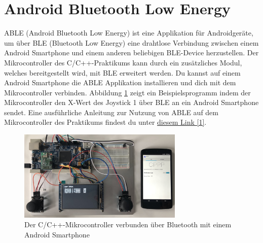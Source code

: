 \section{\ExercisePrefixEmbeddedC Android Bluetooth Low Energy \optional}
ABLE (Android Bluetooth Low Energy) ist eine Applikation für Androidgeräte, um über BLE (Bluetooth Low Energy) eine drahtlose Verbindung zwischen einem Android Smartphone und einem anderen beliebigen BLE-Device herzustellen. Der Mikrocontroller des C/C++-Praktikums kann durch ein zusätzliches Modul, welches bereitgestellt wird, mit BLE erweitert werden. Du kannst auf einem Android Smartphone die ABLE Applikation installieren und dich mit dem Mikrocontroller verbinden. Abbildung \ref{fig:ablePreview} zeigt ein Beispielsprogramm indem der Mikrocontroller den X-Wert des Joystick 1 über BLE an ein Android Smartphone sendet. Eine ausführliche Anleitung zur Nutzung von ABLE auf dem Mikrocontroller des Praktikums findest du unter \href{https://github.com/Echtzeitsysteme/able/wiki/Cpp-Lab-Tutorial}{diesem Link [1]}. 
\begin{figure}[!htb]
	\centering
	\includegraphics[width=0.7\textwidth]{./05_c/figures/ABLE_preview.jpg}
	\caption{Der C/C++-Mikrocontroller verbunden über Bluetooth mit einem Android Smartphone}
	\label{fig:ablePreview}
\end{figure} 
